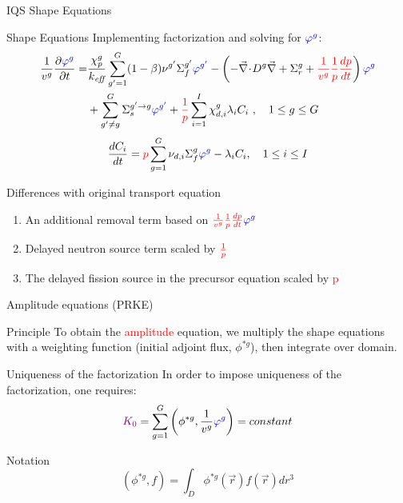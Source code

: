 \documentclass[8pt,xcolor=dvipnames]{beamer}
\renewcommand{\div}{\vec{\nabla}\! \cdot \!}
\newcommand{\grad}{\vec{\nabla}}
\newcommand{\ben}{\begin{enumerate}}
\newcommand{\een}{\end{enumerate}}
\newcommand{\keff}{\ensuremath{k_{\textit{eff}}}}
\newcommand{\tcr}[1]{\textcolor{red}{#1}}
\newcommand{\tcb}[1]{\textcolor{blue}{#1}}
\newcommand{\tcp}[1]{\textcolor{violet}{#1}}
\begin{document}
\begin{frame}{IQS Shape Equations}

\begin{block}{Shape Equations}
Implementing factorization and solving for $\tcb{\varphi^g}$:
\begin{align*}
\frac{1}{v^g} \frac{\partial \tcb{\varphi^g} }{\partial t} =& \frac{\chi_p^g}{\keff} \sum_{g'=1}^G (1-\beta) \nu^{g'} \Sigma_f^{g'} \tcb{\varphi^{g'}} -  \left( -\div D^g \grad  + \Sigma_r^g + \tcr{\frac{1}{v^g}}\tcr{\frac{1}{p}}\tcr{\frac{dp}{dt}}\right) \tcb{\varphi^g}  \nonumber \\
&  + \sum_{g'\neq g}^G\Sigma_s^{g'\to g} \tcb{\varphi^{g'}}  + \tcr{\frac{1}{p}}\sum_{i=1}^I\chi_{d,i}^g\lambda_i C_i \ , \quad 1 \le g \le G 
\end{align*}
\begin{equation*}
\frac{dC_i}{dt} = \tcr{p}\sum_{g=1}^G \nu_{d,i} \Sigma_f^g \tcb{\varphi^{g}} - \lambda_iC_i , \quad 1 \le i \le I
\end{equation*}
\end{block}

\begin{block}{Differences with original transport equation}
\ben
\item An additional removal term based on $\tcr{\frac{1}{v^g}\frac{1}{p}\frac{dp}{dt}} \tcb{\varphi^g}$
\item Delayed neutron source term scaled by $\tcr{\frac{1}{p}}$
\item The delayed fission source in the precursor equation scaled by \tcr{p}
\een
\end{block}

\end{frame}


\begin{frame}{Amplitude equations (PRKE)}

\begin{block}{Principle}
To obtain the \tcr{amplitude} equation, we multiply the shape equations with a weighting 
function (initial adjoint flux, $\phi^{*g}$), then integrate over domain.  
\end{block}

\begin{block}{Uniqueness of the factorization}
In order to impose uniqueness of the factorization, one requires:
\[
\tcp{K_0} = \sum_{g=1}^G\left(\phi^{*g},\frac{1}{v^g}\tcb{\varphi^g}\right)= constant
\]
\end{block}

\begin{block}{Notation}
\[
\left(\phi^{*g},f\right) = \int_D\phi^{*g}(\vec{r})f(\vec{r})dr^3
\]
\end{block}

\end{frame}
\end{document}
